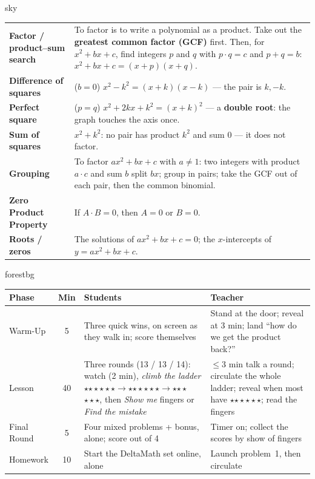 \documentclass[10pt]{article}
\newcommand{\MeetingLength}{60 minutes}
\newcommand{\rung}[1]{{\color{goldacc}\ifcase#1\or$\star$\or$\star\star$\or$\star\star\star$\fi}}
\begin{document}
\begin{skillbox}{sky}
\renewcommand{\arraystretch}{1.3}
\begin{tabularx}{\linewidth}{@{}l X@{}}
\textbf{Factor / product--sum search} & To factor is to write a polynomial as a product. Take
                  out the \textbf{greatest common factor (GCF)} first. Then, for $x^2+bx+c$, find
                  integers $p$ and $q$ with $p\cdot q=c$ and $p+q=b$: $x^2+bx+c=(x+p)(x+q)$. \\
\textbf{Difference of squares} & ($b=0$) $x^2-k^2=(x+k)(x-k)$ --- the pair is $k,-k$. \\
\textbf{Perfect square} & ($p=q$) $x^2+2kx+k^2=(x+k)^2$ --- a \textbf{double root}: the graph
                          touches the axis once. \\
\textbf{Sum of squares} & $x^2+k^2$: no pair has product $k^2$ and sum $0$ --- it does not
                          factor. \\
\textbf{Grouping} & To factor $ax^2+bx+c$ with $a\ne1$: two integers with product $a\cdot c$ and
                    sum $b$ split $bx$; group in pairs; take the GCF out of each pair, then the
                    common binomial. \\
\textbf{Zero Product Property} & If $A\cdot B=0$, then $A=0$ or $B=0$. \\
\textbf{Roots / zeros} & The solutions of $ax^2+bx+c=0$; the $x$-intercepts of
                         $y=ax^2+bx+c$. \\
\end{tabularx}
\end{skillbox}

\begin{fixedskillbox}[Lesson at a Glance --- \MeetingLength]{forestbg}
\renewcommand{\arraystretch}{1.25}
\begin{tabularx}{\linewidth}{@{}l c X X@{}}
\textbf{Phase} & \textbf{Min} & \textbf{Students} & \textbf{Teacher} \\
\hline
Warm-Up & 5 & Three quick wins, on screen as they walk in; score themselves & Stand at the door; reveal at 3 min; land ``how do we get the product back?'' \\
Lesson & 40 & Three rounds (13 / 13 / 14): watch (2 min), \emph{climb the ladder} \rung1$\to$\rung2$\to$\rung3, then \emph{Show me} fingers or \emph{Find the mistake} & $\le$3 min talk a round; circulate the whole ladder; reveal when most have \rung2; read the fingers \\
Final Round & 5 & Four mixed problems + bonus, alone; score out of 4 & Timer on; collect the scores by show of fingers \\
Homework & 10 & Start the DeltaMath set online, alone & Launch problem~1, then circulate \\
\end{tabularx}
\end{fixedskillbox}
\end{document}
